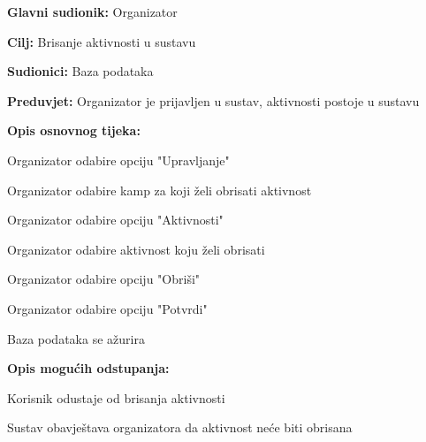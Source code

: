 					\noindent {}
					\begin{packed_item}
						
						\item \textbf{Glavni sudionik: }Organizator
						\item  \textbf{Cilj:} Brisanje aktivnosti u sustavu
						\item  \textbf{Sudionici:} Baza podataka
						\item  \textbf{Preduvjet:} Organizator je prijavljen u sustav, aktivnosti postoje u sustavu
						\item  \textbf{Opis osnovnog tijeka:}
						
						\item[] \begin{packed_enum}
							
							\item Organizator odabire opciju "Upravljanje"
							\item Organizator odabire kamp za koji želi obrisati aktivnost
							\item Organizator odabire opciju "Aktivnosti"
							\item Organizator odabire aktivnost koju želi obrisati
							\item Organizator odabire opciju "Obriši"
							\item Organizator odabire opciju "Potvrdi"
							\item Baza podataka se ažurira
						\end{packed_enum}
						
						\item  \textbf{Opis mogućih odstupanja:}
						
						\item[] \begin{packed_item}
							
							\item[3.a] Korisnik odustaje od brisanja aktivnosti
							\item[] \begin{packed_enum}
								
								\item Sustav obavještava organizatora da aktivnost neće biti obrisana	
								
							\end{packed_enum}
							
							
						\end{packed_item}
					\end{packed_item}
					
